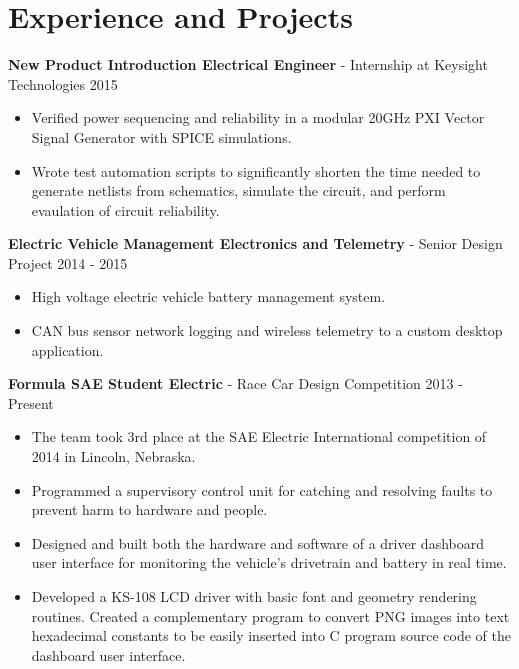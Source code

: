 \documentclass[10pt]{article}
\begin{document}
\section{Experience and Projects}
\begin{adjustwidth}{16pt}{0pt}

\noindent\textbf{New Product Introduction Electrical Engineer} - Internship at Keysight Technologies
\hfill 2015
\begin{itemize}
	\setlength\itemsep{0pt}
	\item Verified power sequencing and reliability in a modular 20GHz
	PXI Vector Signal Generator with SPICE simulations.
	\item Wrote test automation scripts to significantly shorten the time needed
	to generate netlists from schematics, simulate the circuit, and perform
	evaulation of circuit reliability.
\end{itemize}


\vspace{8pt}
\noindent\textbf{Electric Vehicle Management Electronics and Telemetry} - Senior Design Project
\hfill 2014 - 2015
\begin{itemize}
	\setlength\itemsep{0pt}
	\item High voltage electric vehicle battery management system.
	\item CAN bus sensor network logging and wireless telemetry to a custom
	desktop application.
\end{itemize}



\vspace{8pt}
\noindent\textbf{Formula SAE Student Electric} - Race Car Design Competition
\hfill 2013 - Present
\begin{itemize}
	\setlength\itemsep{0pt}
	\item The team took 3rd place at the SAE Electric International competition of
	2014 in Lincoln, Nebraska.
	\item Programmed a supervisory control unit for catching and resolving faults
	to prevent harm to hardware and people.
	\item Designed and built both the hardware and software of a driver dashboard
	user interface for monitoring the vehicle's drivetrain and battery in real
	time.
	\item Developed a KS-108 LCD driver with basic font and geometry rendering
	routines. Created a complementary program to convert PNG images into text
	hexadecimal constants to be easily inserted into C program source code of the
	dashboard user interface.
\end{itemize}



\end{adjustwidth}
\end{document}

